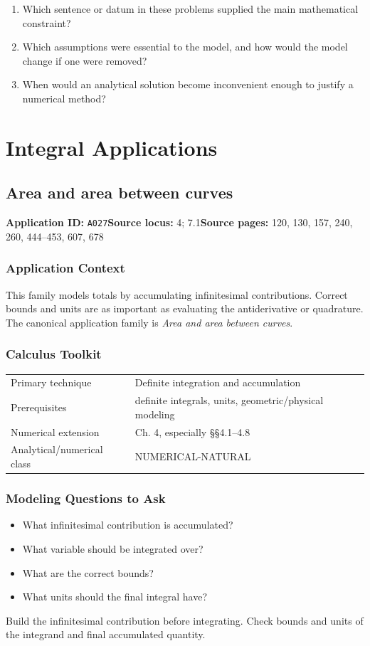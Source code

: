 \documentclass[11pt]{book}
\newcommand{\pid}[1]{\texttt{#1}}
\begin{document}
\begin{reflectionbox}\begin{enumerate}
\item Which sentence or datum in these problems supplied the main mathematical constraint?
\item Which assumptions were essential to the model, and how would the model change if one were removed?
\item When would an analytical solution become inconvenient enough to justify a numerical method?
\end{enumerate}\end{reflectionbox}
\part{Integral Applications}
\chapter{Area and area between curves}\label{app:A027}
\textbf{Application ID:} \pid{A027}\quad \textbf{Source locus:} 4; 7.1\quad \textbf{Source pages:} 120, 130, 157, 240, 260, 444–453, 607, 678
\section*{Application Context}
This family models totals by accumulating infinitesimal contributions. Correct bounds and units are as important as evaluating the antiderivative or quadrature. The canonical application family is \emph{Area and area between curves}.
\section*{Calculus Toolkit}
\begin{tabularx}{\textwidth}{@{}lX@{}}\toprule
Primary technique & Definite integration and accumulation \\
Prerequisites & definite integrals, units, geometric/physical modeling \\
Numerical extension & Ch. 4, especially §§4.1–4.8 \\
Analytical/numerical class & NUMERICAL-NATURAL \\
\bottomrule\end{tabularx}
\section*{Modeling Questions to Ask}\begin{itemize}
\item What infinitesimal contribution is accumulated?
\item What variable should be integrated over?
\item What are the correct bounds?
\item What units should the final integral have?
\end{itemize}
\begin{errorbox}Build the infinitesimal contribution before integrating. Check bounds and units of the integrand and final accumulated quantity.\end{errorbox}
\end{document}
